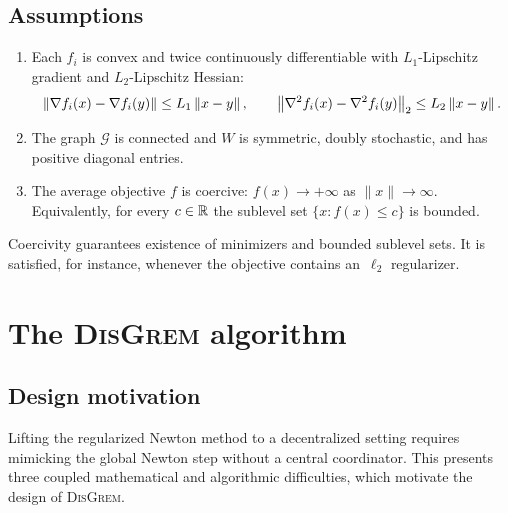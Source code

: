\documentclass[review,onefignum,onetabnum]{siamart171218}
\begin{document}
	\subsection{Assumptions}
	\begin{assumption}\label{ass:problem}
		\leavevmode\par\nopagebreak\vspace{-0.6\baselineskip}
		\begin{enumerate}[label=(\roman*),leftmargin=2em,itemsep=4pt,topsep=4pt]
			\item Each $f_i$ is convex and twice continuously differentiable
			with $L_1$-Lipschitz gradient and $L_2$-Lipschitz Hessian:
			\[
			\left\|\nabla f_i(x)-\nabla f_i(y)\right\|\le L_1\left\|x-y\right\|,
			\qquad
			\left\|\nabla^2 f_i(x)-\nabla^2 f_i(y)\right\|_2\le L_2\left\|x-y\right\|.
			\]
		\item The graph $\mathcal G$ is connected and $W$ is symmetric,
		doubly stochastic, and has positive diagonal entries.
			\item The average objective $f$ is coercive: $f(x)\to+\infty$ as $\|x\|\to\infty$.
			Equivalently, for every $c\in\mathbb{R}$ the sublevel set $\{x:f(x)\le c\}$ is bounded.
		\end{enumerate}
	\end{assumption}
	
	\begin{remark}\label{rem:coercivity}
		Coercivity guarantees existence of minimizers and bounded sublevel
		sets. It is satisfied, for instance, whenever the objective contains
		an~$\ell_2$ regularizer.
	\end{remark}
	
	
	\section{The \textsc{DisGrem} algorithm}\label{sec:alg}
	
	\subsection{Design motivation}\label{ssec:design}
	
	Lifting the regularized Newton method to a decentralized setting
	requires mimicking the global Newton step without a central
	coordinator.
	This presents three coupled mathematical and algorithmic
	difficulties, which motivate the design of \textsc{DisGrem}.
	
\end{document}
